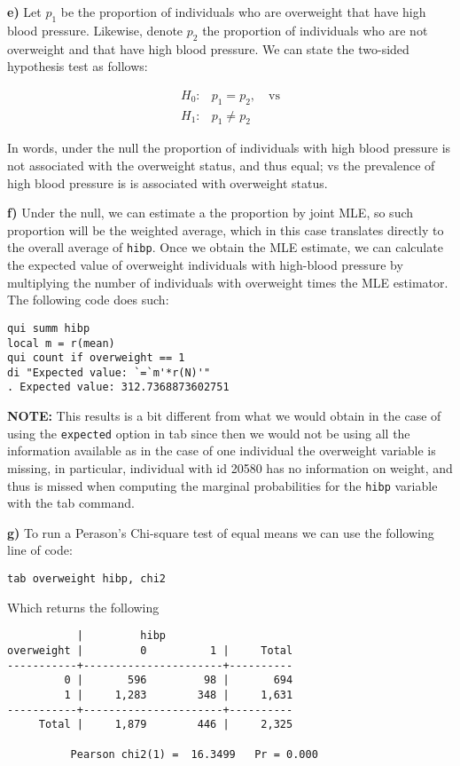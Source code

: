 \documentclass{article}
\begin{document}
\textbf{e)} Let $p_1$ be the proportion of individuals who are overweight that have high blood pressure. Likewise, denote $p_2$ the proportion of individuals who are not overweight and that have high blood pressure. We can state the two-sided hypothesis test as follows:

\begin{align*}
    H_0: & p_1 = p_2,\quad \mbox{vs} \\
    H_1: & p_1 \neq p_2
\end{align*}

\noindent In words, under the null the proportion of individuals with high blood pressure is not associated with the overweight status, and thus equal; vs the prevalence of high blood pressure is is associated with overweight status.

\textbf{f)} Under the null, we can estimate a the proportion by joint MLE, so such proportion
will be the weighted average, which in this case translates directly to the
overall average of \texttt{hibp}. Once we obtain the MLE estimate, we can 
calculate the expected value of overweight individuals with high-blood pressure
by multiplying the number of individuals with overweight times the MLE estimator.
The following code does such:

\begin{verbatim}
qui summ hibp
local m = r(mean)
qui count if overweight == 1
di "Expected value: `=`m'*r(N)'"
. Expected value: 312.7368873602751
\end{verbatim}

{\color{red} \textbf{NOTE:}} This results is a bit different from what we would obtain in the case of using the \texttt{expected} option in tab since then we would not be using all the information available as in the case of one individual the overweight variable is missing, in particular, individual with id 20580 has no information on weight, and thus is missed when computing the marginal probabilities for the \texttt{hibp} variable with the tab command.

\textbf{g)} To run a Perason's Chi-square test of equal means we can use the following line of code:

\begin{verbatim}
tab overweight hibp, chi2
\end{verbatim}

Which returns the following

\begin{verbatim}
           |         hibp
overweight |         0          1 |     Total
-----------+----------------------+----------
         0 |       596         98 |       694 
         1 |     1,283        348 |     1,631 
-----------+----------------------+----------
     Total |     1,879        446 |     2,325 

          Pearson chi2(1) =  16.3499   Pr = 0.000
\end{verbatim}
\end{document}

